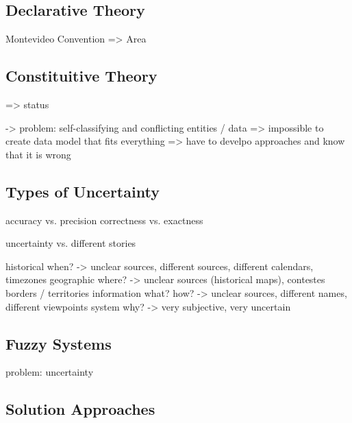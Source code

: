 \subsection{Declarative Theory} %
\label{sub:declarative_theory}

Montevideo Convention
=> Area

\subsection{Constituitive Theory} %
\label{sub:constituitive_theory}


=> status


-> problem: self-classifying and conflicting entities / data => impossible to create data model that fits everything
=> have to develpo approaches and know that it is wrong



\subsection{Types of Uncertainty} %
\label{sub:types_of_uncertainty}

accuracy vs. precision
correctness vs. exactness

uncertainty vs. different stories

historical      when?       -> unclear sources, different sources, different calendars, timezones
geographic      where?      -> unclear sources (historical maps), contestes borders / territories
information     what? how?  -> unclear sources, different names, different viewpoints
system          why?        -> very subjective, very uncertain





\subsection{Fuzzy Systems} %
\label{sub:fuzzy_systems}

problem: uncertainty



\subsection{Solution Approaches} %
\label{sub:solution_approaches}




